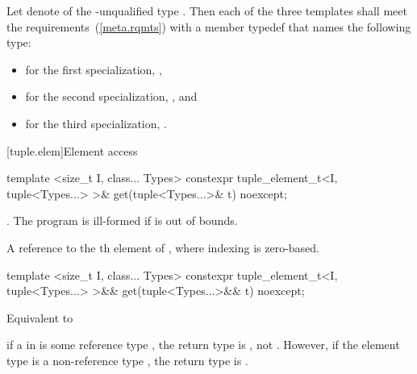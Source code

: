 \begin{itemdescr}
Let  denote  of the \cv-unqualified type . Then
each of the three templates shall meet the 
requirements~(\ref{meta.rqmts}) with a member typedef  that names the following
type:

\begin{itemize}
\item
for the first specialization, ,

\item
for the second specialization, , and

\item
for the third specialization, .

\end{itemize}

\end{itemdescr}

[tuple.elem]{Element access}

%
%
\begin{itemdecl}
template <size_t I, class... Types>
  constexpr tuple_element_t<I, tuple<Types...> >& get(tuple<Types...>& t) noexcept;
\end{itemdecl}

\begin{itemdescr}
\pnum
\requires {}.
The program is ill-formed if  is out of bounds.

\pnum
\returns  A reference to the th element of , where
indexing is zero-based.
\end{itemdescr}

%
%
\begin{itemdecl}
template <size_t I, class... Types>
  constexpr tuple_element_t<I, tuple<Types...> >&& get(tuple<Types...>&& t) noexcept;
\end{itemdecl}

\begin{itemdescr}
\pnum
\effects Equivalent to
\\

\pnum
\realnote if a  in  is some reference type , the return
type is , not . However, if the element type is a non-reference type
, the return type is .
\end{itemdescr}

